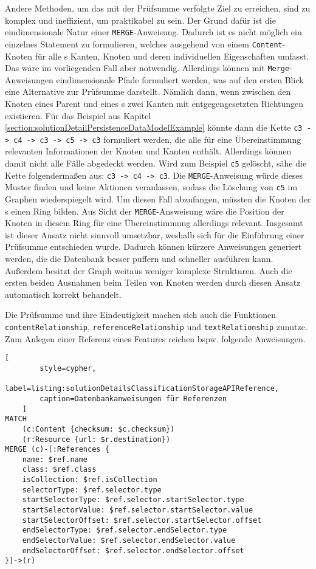     Andere Methoden, um das mit der Prüfsumme verfolgte Ziel zu erreichen,
    sind zu komplex und ineffizient, um praktikabel zu sein.
    Der Grund dafür ist die eindimensionale Natur einer \texttt{MERGE}-Anweisung.
    Dadurch ist es nicht möglich ein einzelnes Statement zu formulieren,
    welches ausgehend von einem \texttt{Content}-Knoten für alle {\childFeature}s
    Kanten, Knoten und deren individuellen Eigenschaften umfasst.
    Das wäre im vorliegenden Fall aber notwendig.
    Allerdings können mit \texttt{Merge}-Anweisungen eindimensionale Pfade formuliert werden,
    was auf den ersten Blick eine Alternative zur Prüfsumme darstellt.
    Nämlich dann, wenn zwischen den Knoten eines Parent und eines {\childFeature}s
    zwei Kanten mit entgegengesetzten Richtungen existieren.
    Für das Beispiel aus Kapitel \ref{section:solutionDetailPersistenceDataModelExample} könnte dann
    die Kette \texttt{c3 -> c4 -> c3 -> c5 -> c3} formuliert werden,
    die alle für eine Übereinstimmung relevanten Informationen der Knoten und Kanten enthält.
    Allerdings können damit nicht alle Fälle abgedeckt werden.
    Wird zum Beispiel \texttt{c5} gelöscht, sähe die Kette folgendermaßen aus:
    \texttt{c3 -> c4 -> c3}.
    Die \texttt{MERGE}-Anweisung würde dieses Muster finden und keine Aktionen veranlassen,
    sodass die Löschung von \texttt{c5} im Graphen wiederspiegelt wird.
    Um diesen Fall abzufangen, müssten die Knoten der {\childFeature}s einen Ring bilden.
    Aus Sicht der \texttt{MERGE}-Answeisung wäre die Position der Knoten in diesem Ring
    für eine Übereinstimmung allerdings relevant.
    Insgesamt ist dieser Ansatz nicht sinnvoll umsetzbar,
    weshalb sich für die Einführung einer Prüfsumme entschieden wurde.
    Dadurch können kürzere Anweisungen generiert werden, die die Datenbank besser puffern
    und schneller ausführen kann.
    Außerdem besitzt der Graph weitaus weniger komplexe Strukturen.
    Auch die ersten beiden Ausnahmen beim Teilen von Knoten werden durch diesen Ansatz
    automatisch korrekt behandelt.

    Die Prüfsumme und ihre Eindeutigkeit machen sich auch die Funktionen
    \texttt{contentRelationship}, \texttt{referenceRelationship} und \texttt{textRelationship} zunutze.
    Zum Anlegen einer Referenz eines Features reichen bspw. folgende Anweisungen.

\begin{lstlisting}[
        style=cypher,
        label=listing:solutionDetailsClassificationStorageAPIReference,
        caption=Datenbankanweisungen für Referenzen
    ]
MATCH
    (c:Content {checksum: $c.checksum})
    (r:Resource {url: $r.destination})
MERGE (c)-[:References {
    name: $ref.name
    class: $ref.class
    isCollection: $ref.isCollection
    selectorType: $ref.selector.type
    startSelectorType: $ref.selector.startSelector.type
    startSelectorValue: $ref.selector.startSelector.value
    startSelectorOffset: $ref.selector.startSelector.offset
    endSelectorType: $ref.selector.endSelector.type
    endSelectorValue: $ref.selector.endSelector.value
    endSelectorOffset: $ref.selector.endSelector.offset
}]->(r)
    \end{lstlisting}

